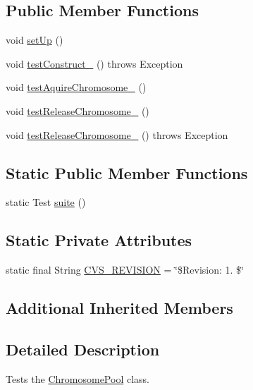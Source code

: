 \subsection*{Public Member Functions}
\begin{DoxyCompactItemize}
\item 
void \hyperlink{classorg_1_1jgap_1_1impl_1_1_chromosome_pool_test_a59b59a8939b97d96f08fb3721a137fb3}{set\-Up} ()
\item 
void \hyperlink{classorg_1_1jgap_1_1impl_1_1_chromosome_pool_test_a1b21b31704823032325afcaf6a92354c}{test\-Construct\-\_} ()  throws Exception 
\item 
void \hyperlink{classorg_1_1jgap_1_1impl_1_1_chromosome_pool_test_a689607025ac2ed2170b30f9bb94799dd}{test\-Aquire\-Chromosome\-\_} ()
\item 
void \hyperlink{classorg_1_1jgap_1_1impl_1_1_chromosome_pool_test_ac1ddc0010d4b3f0d2123628c886dea41}{test\-Release\-Chromosome\-\_} ()
\item 
void \hyperlink{classorg_1_1jgap_1_1impl_1_1_chromosome_pool_test_ab0e9900de6a8a7ba34a91ee7f904e856}{test\-Release\-Chromosome\-\_} ()  throws Exception 
\end{DoxyCompactItemize}
\subsection*{Static Public Member Functions}
\begin{DoxyCompactItemize}
\item 
static Test \hyperlink{classorg_1_1jgap_1_1impl_1_1_chromosome_pool_test_a55bff0d2afeb0fb43b029ebf548a1674}{suite} ()
\end{DoxyCompactItemize}
\subsection*{Static Private Attributes}
\begin{DoxyCompactItemize}
\item 
static final String \hyperlink{classorg_1_1jgap_1_1impl_1_1_chromosome_pool_test_a7e104e684c196518f46f73b43505b362}{C\-V\-S\-\_\-\-R\-E\-V\-I\-S\-I\-O\-N} = \char`\"{}\$Revision\-: 1. \$\char`\"{}
\end{DoxyCompactItemize}
\subsection*{Additional Inherited Members}


\subsection{Detailed Description}
Tests the \hyperlink{classorg_1_1jgap_1_1impl_1_1_chromosome_pool}{Chromosome\-Pool} class.


